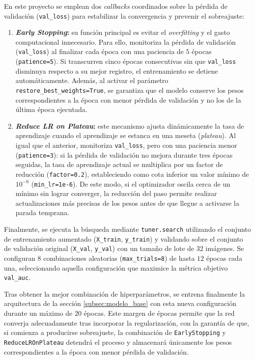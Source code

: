 \documentclass[11pt, a4paper]{article}
\numberwithin{equation}{section}
\begin{document}
En este proyecto se emplean dos \textit{callbacks} coordinados sobre la pérdida de validación (\texttt{val\_loss}) para estabilizar la convergencia y prevenir el sobreajuste:

\begin{enumerate}
    \item \textbf{\textit{Early Stopping}:} su función principal es evitar el \textit{overfitting} y el gasto computacional innecesario. Para ello, monitoriza la pérdida de validación (\texttt{val\_loss}) al finalizar cada época con una paciencia de $5$ épocas (\texttt{patience=5}). Si transcurren cinco épocas consecutivas sin que \texttt{val\_loss} disminuya respecto a su mejor registro, el entrenamiento se detiene automáticamente. Además, al activar el parámetro \texttt{restore\_best\_weights=True}, se garantiza que el modelo conserve los pesos correspondientes a la época con menor pérdida de validación y no los de la última época ejecutada.

    \item \textbf{\textit{Reduce LR on Plateau}:} este mecanismo ajusta dinámicamente la tasa de aprendizaje cuando el aprendizaje se estanca en una meseta (\textit{plateau}). Al igual que el anterior, monitoriza \texttt{val\_loss}, pero con una paciencia menor (\texttt{patience=3}): si la pérdida de validación no mejora durante tres épocas seguidas, la tasa de aprendizaje actual se multiplica por un factor de reducción (\texttt{factor=0.2}), estableciendo como cota inferior un valor mínimo de $10^{-6}$ (\texttt{min\_lr=1e-6}). De este modo, si el optimizador oscila cerca de un mínimo sin lograr converger, la reducción del paso permite realizar actualizaciones más precisas de los pesos antes de que llegue a activarse la parada temprana.
\end{enumerate}

Finalmente, se ejecuta la búsqueda mediante \texttt{tuner.search} utilizando el conjunto de entrenamiento aumentado (\texttt{X\_train}, \texttt{y\_train}) y validando sobre el conjunto de validación original (\texttt{X\_val}, \texttt{y\_val}) con un tamaño de lote de $32$ imágenes. Se configuran $8$ combinaciones aleatorias (\texttt{max\_trials=8}) de hasta $12$ épocas cada una, seleccionando aquella configuración que maximice la métrica objetivo \texttt{val\_auc}.

Tras obtener la mejor combinación de hiperparámetros, se entrena finalmente la arquitectura de la sección \ref{subsec:modelo_base} con esta nueva configuración durante un máximo de $20$ épocas. Este margen de épocas permite que la red converja adecuadamente tras incorporar la regularización, con la garantía de que, si comienza a producirse sobreajuste, la combinación de \texttt{EarlyStopping} y \texttt{ReduceLROnPlateau} detendrá el proceso y almacenará únicamente los pesos correspondientes a la época con menor pérdida de validación.
\end{document}
